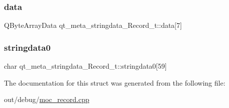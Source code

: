 \subsubsection{\texorpdfstring{data}{data}}
{\footnotesize\ttfamily Q\+Byte\+Array\+Data qt\+\_\+meta\+\_\+stringdata\+\_\+\+Record\+\_\+t\+::data\mbox{[}7\mbox{]}}

\mbox{\label{structqt__meta__stringdata___record__t_a76c89ce986c1b003262fedde8da4ebe6}} 
\subsubsection{\texorpdfstring{stringdata0}{stringdata0}}
{\footnotesize\ttfamily char qt\+\_\+meta\+\_\+stringdata\+\_\+\+Record\+\_\+t\+::stringdata0\mbox{[}59\mbox{]}}



The documentation for this struct was generated from the following file\+:\begin{DoxyCompactItemize}
\item 
out/debug/\mbox{\hyperlink{moc__record_8cpp}{moc\+\_\+record.\+cpp}}\end{DoxyCompactItemize}
